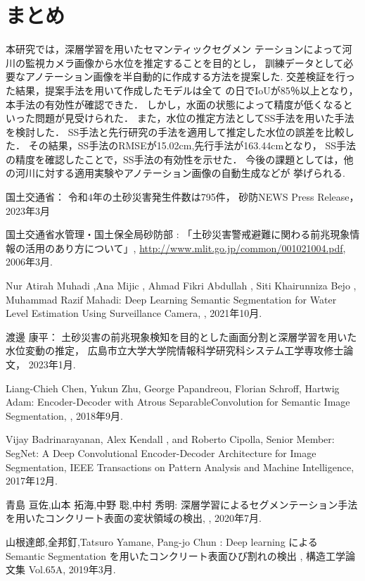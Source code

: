 \section{まとめ}
\label{7}
本研究では，深層学習を用いたセマンティックセグメン
テーションによって河川の監視カメラ画像から水位を推定することを目的とし，
訓練データとして必要なアノテーション画像を半自動的に作成する方法を提案した.
交差検証を行った結果，提案手法を用いて作成したモデルは全て
の日でIoUが85％以上となり，本手法の有効性が確認できた．
しかし，水面の状態によって精度が低くなるといった問題が見受けられた．
また，水位の推定方法としてSS手法を用いた手法を検討した．
SS手法と先行研究の手法を適用して推定した水位の誤差を比較した．
その結果，SS手法のRMSEが15.02cm,先行手法が163.44cmとなり，
SS手法の精度を確認したことで，SS手法の有効性を示せた．
今後の課題としては，他の河川に対する適用実験やアノテーション画像の自動生成などが
挙げられる.
\clearpage



\begin{thebibliography}{99}
  国土交通省：
  令和4年の土砂災害発生件数は795件，
  砂防NEWS Press Release，2023年3月

  国土交通省水管理・国土保全局砂防部 : 
  「土砂災害警戒避難に関わる前兆現象情報の活用のあり方について」, 
  \url{http://www.mlit.go.jp/common/001021004.pdf}, 2006年3月. 

  Nur Atirah Muhadi ,Ana Mijic , Ahmad Fikri Abdullah ,
  Siti Khairunniza Bejo , Muhammad Razif Mahadi: 
  Deep Learning Semantic Segmentation for Water Level Estimation Using Surveillance Camera, 
  , 2021年10月. 

  渡邊 康平：
  土砂災害の前兆現象検知を目的とした画面分割と深層学習を用いた水位変動の推定，
  広島市立大学大学院情報科学研究科システム工学専攻修士論文，
  2023年1月. 

  Liang-Chieh Chen, Yukun Zhu, George Papandreou, Florian Schroff, Hartwig Adam: 
  Encoder-Decoder with Atrous SeparableConvolution for Semantic Image Segmentation, 
  , 2018年9月. 

  Vijay Badrinarayanan, Alex Kendall , and Roberto Cipolla, Senior Member: 
  SegNet: A Deep Convolutional Encoder-Decoder Architecture for Image Segmentation, 
  IEEE Transactions on Pattern Analysis and Machine Intelligence, 2017年12月. 

  青島 亘佐,山本 拓海,中野 聡,中村 秀明: 
  深層学習によるセグメンテーション手法を用いたコンクリート表面の変状領域の検出, 
  , 2020年7月. 
  
  山根達郎,全邦釘,Tatsuro Yamane, Pang-jo Chun : 
  Deep learning による Semantic Segmentation を用いたコンクリート表面ひび割れの検出 , 
  構造工学論文集 Vol.65A, 2019年3月. 
  
\end{thebibliography}

